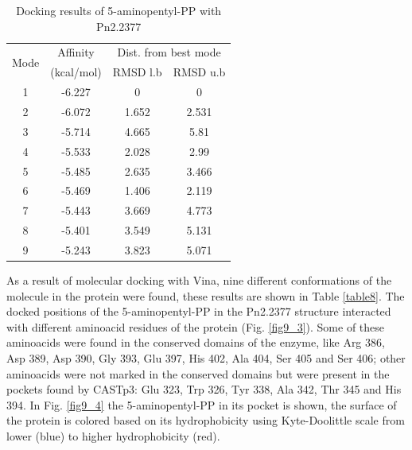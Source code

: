 \documentclass[12pt]{article}
\begin{document}
	
	\begin{table}[h!]
		\centering
		\caption{\centering Docking results of 5-aminopentyl-PP with Pn2.2377}
		\label{table9}
		\begin{tabular}{cccc}
			\toprule
			\multirow{2}{*}{Mode} & Affinity & \multicolumn{2}{c}{Dist. from best mode}\\
			&  (kcal/mol) & RMSD l.b & RMSD u.b\\
			\midrule
			1 & -6.227 & 0     & 0     \\
			2 & -6.072 & 1.652 & 2.531 \\
			3 & -5.714 & 4.665 & 5.81  \\
			4 & -5.533 & 2.028 & 2.99  \\
			5 & -5.485 & 2.635 & 3.466 \\
			6 & -5.469 & 1.406 & 2.119 \\
			7 & -5.443 & 3.669 & 4.773 \\
			8 & -5.401 & 3.549 & 5.131 \\
			9 & -5.243 & 3.823 & 5.071 \\
			\bottomrule
		\end{tabular}
	\end{table}
	
	As a result of molecular docking with Vina, nine different conformations of the molecule in the protein were found, these results are shown in Table \ref{table8}. The docked positions of the 5-aminopentyl-PP in the Pn2.2377 structure interacted with different aminoacid residues of the protein (Fig. \ref{fig9_3}). Some of these aminoacids were found in the conserved domains of the enzyme, like Arg 386, Asp 389, Asp 390, Gly 393, Glu 397, His 402, Ala 404, Ser 405 and Ser 406; other aminoacids were not marked in the conserved domains but were present in the pockets found by CASTp3: Glu 323, Trp 326, Tyr 338, Ala 342, Thr 345 and His 394. In Fig. \ref{fig9_4} the 5-aminopentyl-PP in its pocket is shown, the surface of the protein is colored based on its hydrophobicity using Kyte-Doolittle scale from lower (blue) to higher hydrophobicity (red).
	
	\newpage
	
\end{document}

